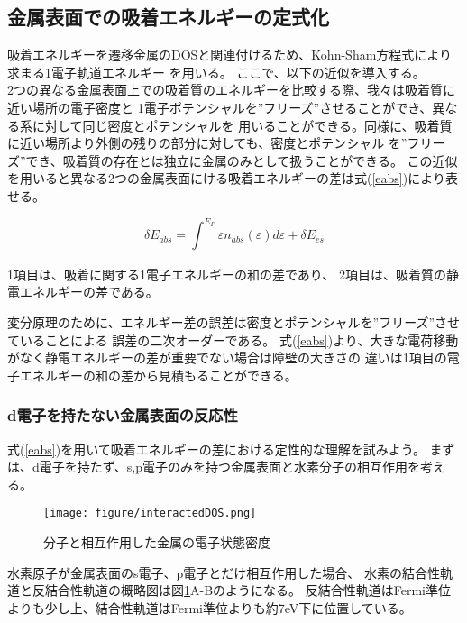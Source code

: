 \documentclass[12pt]{ltjsarticle}
\begin{document}
\subsection{金属表面での吸着エネルギーの定式化}
吸着エネルギーを遷移金属のDOSと関連付けるため、Kohn-Sham方程式により求まる1電子軌道エネルギー
を用いる。
ここで、以下の近似を導入する。\\
2つの異なる金属表面上での吸着質のエネルギーを比較する際、我々は吸着質に近い場所の電子密度と
1電子ポテンシャルを”フリーズ”させることができ、異なる系に対して同じ密度とポテンシャルを
用いることができる。同様に、吸着質に近い場所より外側の残りの部分に対しても、密度とポテンシャル
を”フリーズ”でき、吸着質の存在とは独立に金属のみとして扱うことができる。
この近似を用いると異なる2つの金属表面にける吸着エネルギーの差は式(\ref{eabs})により表せる。

\begin{equation}
    \label{eabs}
    \delta E_{abs} = \int_{}^{E_F} \varepsilon n_{abs}(\varepsilon) d\varepsilon + 
    \delta E_{es}
\end{equation}

1項目は、吸着に関する1電子エネルギーの和の差であり、
2項目は、吸着質の静電エネルギーの差である。

変分原理のために、エネルギー差の誤差は密度とポテンシャルを”フリーズ”させていることによる
誤差の二次オーダーである。
式(\ref{eabs})より、大きな電荷移動がなく静電エネルギーの差が重要でない場合は障壁の大きさの
違いは1項目の電子エネルギーの和の差から見積もることができる。

\subsubsection{d電子を持たない金属表面の反応性}
式(\ref{eabs})を用いて吸着エネルギーの差における定性的な理解を試みよう。
まずは、d電子を持たず、s,p電子のみを持つ金属表面と水素分子の相互作用を考える。

\begin{figure}[hbtp]
    \begin{center}
     \texttt{[image: figure/interactedDOS.png]}
    \end{center}
    \caption{分子と相互作用した金属の電子状態密度}
    \label{fig:interactedDOS}
\end{figure}

水素原子が金属表面のs電子、p電子とだけ相互作用した場合、
水素の結合性軌道と反結合性軌道の概略図は図\ref{fig:interactedDOS}A-Bのようになる。
反結合性軌道はFermi準位よりも少し上、結合性軌道はFermi準位よりも約7eV下に位置している。
\end{document}
